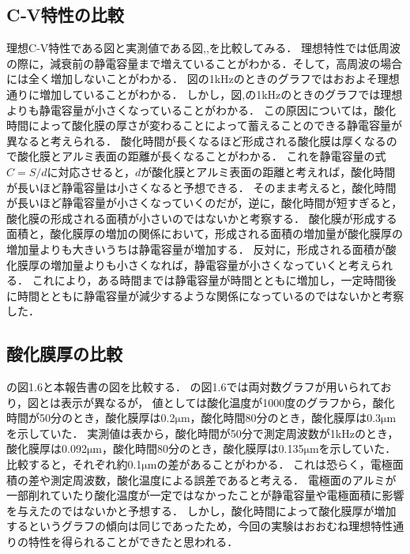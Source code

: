\documentclass[11pt]{jarticle}
\begin{document}
	\subsection{C‐V特性の比較}
		理想C‐V特性である図と実測値である図,,を比較してみる．
		理想特性では低周波の際に，減衰前の静電容量まで増えていることがわかる．そして，高周波の場合には全く増加しないことがわかる．
		図の1kHzのときのグラフではおおよそ理想通りに増加していることがわかる．
		しかし，図,の1kHzのときのグラフでは理想よりも静電容量が小さくなっていることがわかる．
		この原因については，酸化時間によって酸化膜の厚さが変わることによって蓄えることのできる静電容量が異なると考えられる．
		酸化時間が長くなるほど形成される酸化膜は厚くなるので酸化膜とアルミ表面の距離が長くなることがわかる．
		これを静電容量の式$C=S/d$に対応させると，$d$が酸化膜とアルミ表面の距離と考えれば，酸化時間が長いほど静電容量は小さくなると予想できる．
		そのまま考えると，酸化時間が長いほど静電容量が小さくなっていくのだが，逆に，酸化時間が短すぎると，酸化膜の形成される面積が小さいのではないかと考察する．
		酸化膜が形成する面積と，酸化膜厚の増加の関係において，形成される面積の増加量が酸化膜厚の増加量よりも大きいうちは静電容量が増加する．
		反対に，形成される面積が酸化膜厚の増加量よりも小さくなれば，静電容量が小さくなっていくと考えられる．
		これにより，ある時間までは静電容量が時間とともに増加し，一定時間後に時間とともに静電容量が減少するような関係になっているのではないかと考察した．
	
	\subsection{酸化膜厚の比較}
		\cite{ref:指導書}の図1.6と本報告書の図を比較する．
		\cite{ref:指導書}の図1.6では両対数グラフが用いられており，図とは表示が異なるが，
		値としては酸化温度が1000度のグラフから，酸化時間が50分のとき，酸化膜厚は0.2$\mathrm{\mu m}$，酸化時間80分のとき，酸化膜厚は0.3$\mathrm{\mu m}$を示していた．
		実測値は表から，酸化時間が50分で測定周波数が1kHzのとき，酸化膜厚は0.092$\mathrm{\mu m}$，酸化時間80分のとき，酸化膜厚は0.135$\mathrm{\mu m}$を示していた．
		比較すると，それぞれ約0.1$\mathrm{\mu m}$の差があることがわかる．
		これは恐らく，電極面積の差や測定周波数，酸化温度による誤差であると考える．
		電極面のアルミが一部削れていたり酸化温度が一定ではなかったことが静電容量や電極面積に影響を与えたのではないかと予想する．
		しかし，酸化時間によって酸化膜厚が増加するというグラフの傾向は同じであったため，今回の実験はおおむね理想特性通りの特性を得られることができたと思われる．
\end{document}
